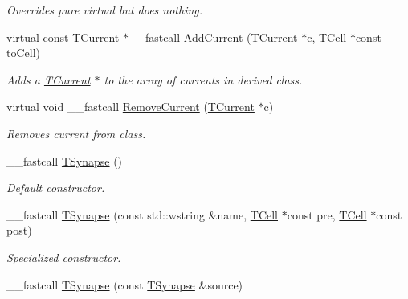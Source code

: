 \begin{DoxyCompactItemize}
\begin{DoxyCompactList}\small\item\em Overrides pure virtual but does nothing. \end{DoxyCompactList}\item 
virtual const \hyperlink{class_t_current}{T\+Current} $\ast$\+\_\+\+\_\+fastcall \hyperlink{class_t_synapse_a40391153a81e8b475c56ba9a9df9fcfc}{Add\+Current} (\hyperlink{class_t_current}{T\+Current} $\ast$c, \hyperlink{class_t_cell}{T\+Cell} $\ast$const to\+Cell)
\begin{DoxyCompactList}\small\item\em Adds a \hyperlink{class_t_current}{T\+Current} $\ast$ to the array of currents in derived class. \end{DoxyCompactList}\item 
virtual void \+\_\+\+\_\+fastcall \hyperlink{class_t_synapse_a21516d391133b6be97c4a63320563f0a}{Remove\+Current} (\hyperlink{class_t_current}{T\+Current} $\ast$c)
\begin{DoxyCompactList}\small\item\em Removes current from class. \end{DoxyCompactList}\item 
\hypertarget{class_t_synapse_a8289fd860026a783dd0cd8ae47c017f5}{\+\_\+\+\_\+fastcall \hyperlink{class_t_synapse_a8289fd860026a783dd0cd8ae47c017f5}{T\+Synapse} ()}\label{class_t_synapse_a8289fd860026a783dd0cd8ae47c017f5}

\begin{DoxyCompactList}\small\item\em Default constructor. \end{DoxyCompactList}\item 
\hypertarget{class_t_synapse_a06372c470201820a66374d982260e612}{\+\_\+\+\_\+fastcall \hyperlink{class_t_synapse_a06372c470201820a66374d982260e612}{T\+Synapse} (const std\+::wstring \&name, \hyperlink{class_t_cell}{T\+Cell} $\ast$const pre, \hyperlink{class_t_cell}{T\+Cell} $\ast$const post)}\label{class_t_synapse_a06372c470201820a66374d982260e612}

\begin{DoxyCompactList}\small\item\em Specialized constructor. \end{DoxyCompactList}\item 
\hypertarget{class_t_synapse_aeb11eb0673e05f9fce5bf470afe373e9}{\+\_\+\+\_\+fastcall \hyperlink{class_t_synapse_aeb11eb0673e05f9fce5bf470afe373e9}{T\+Synapse} (const \hyperlink{class_t_synapse}{T\+Synapse} \&source)}\label{class_t_synapse_aeb11eb0673e05f9fce5bf470afe373e9}


\end{DoxyCompactItemize}
